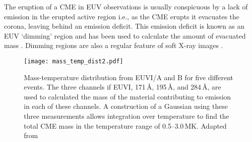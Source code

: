 The eruption of a CME in EUV observations is usually conspicuous by a lack of emission in the erupted active region i.e., as the CME erupts it evacuates the corona, leaving behind an emission deficit. This emission deficit is known as an EUV `dimming' region and has been used to calculate the amount of evacuated mass \citep{aschw09}. Dimming regions are also a regular feature of soft X-ray images \citep{sterling1997}.
%
%
%
\begin{figure}[t!]
\begin{center}
\texttt{[image: mass\_temp\_dist2.pdf]}
\caption[Mass-temperature distribution]{Mass-temperature distribution from EUVI/A and B for five different events. The three channels if EUVI, 171\,\AA, 195\,\AA, and 284\,\AA, are used to calculated the mass of the material contributing to emission in each of these channels. A construction of a Gaussian using these three measurements allows integration over temperature to find the total CME mass in the temperature range of 0.5--3.0\,MK. Adapted from \citep{aschw09}}
\label{fig:euvi_mass}
\end{center}
\end{figure}


